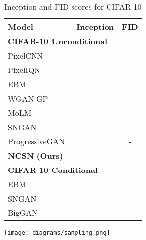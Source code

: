 \documentclass{article}
\begin{document}
\begin{table}\begin{minipage}[b]{0.55\linewidth}
\begin{center}
\begin{adjustbox}{max width=0.8\linewidth}
\begin{tabular}{lcc}
        \toprule
        Model & Inception & FID\\
        \midrule
        \multicolumn{3}{l}{\textbf{CIFAR-10 Unconditional}} \\
        \midrule
        PixelCNN~\cite{van2016conditional} &  & \\
        PixelIQN~\cite{ostrovski2018autoregressive} &  & \\
        EBM~\cite{du2019implicit} &  &  \\
        WGAN-GP~\cite{gulrajani2017improved} &  & \\
        MoLM~\cite{ravuri2018learning} &  & \\
        SNGAN~\cite{miyato2018spectral} &  &  \\
        ProgressiveGAN~\cite{karras2018progressive} &  & - \\
        \textbf{NCSN (Ours)} & {} & \\
        \midrule
        \multicolumn{3}{l}{\textbf{CIFAR-10 Conditional}}\\
        \midrule
        EBM~\cite{du2019implicit} &  &  \\
        SNGAN~\cite{miyato2018spectral} &  & \\
        BigGAN~\cite{brock2018large} &  & \\
        \bottomrule
    \end{tabular} 
\end{adjustbox}
\end{center}
\caption{Inception and FID scores for CIFAR-10} \label{tab:score}
\end{minipage}\hfill
\begin{minipage}[b]{0.45\linewidth}
\begin{center}
\texttt{[image: diagrams/sampling.png]}
\end{center}
\label{fig:sampling}
\end{minipage}
\end{table}
\end{document}
